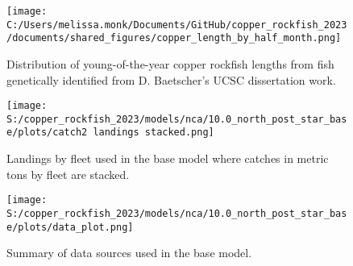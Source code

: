 \documentclass[11pt,
  letterpaper,
]{article}
\begin{document}
\begin{figure}
{\centering
\texttt{[image: C:/Users/melissa.monk/Documents/GitHub/copper\_rockfish\_2023/documents/shared\_figures/copper\_length\_by\_half\_month.png]}
}
\caption{Distribution of young-of-the-year copper rockfish lengths from fish genetically identified from D. Baetscher's UCSC dissertation work.\label{fig:copper-smurf-length}}
\end{figure}

\pagebreak

\begin{figure}
{\centering
\texttt{[image: S:/copper\_rockfish\_2023/models/nca/10.0\_north\_post\_star\_base/plots/catch2 landings stacked.png]}
}
\caption{Landings by fleet used in the base model where catches in metric tons by fleet are stacked.\label{fig:catch}}
\end{figure}

\pagebreak

\begin{figure}
{\centering
\texttt{[image: S:/copper\_rockfish\_2023/models/nca/10.0\_north\_post\_star\_base/plots/data\_plot.png]}
}
\caption{Summary of data sources used in the base model.\label{fig:data-plot}}
\end{figure}
\end{document}
